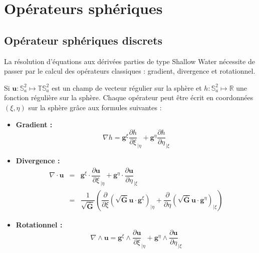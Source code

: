 
\chapter{Opérateurs sphériques}

\section{Opérateur sphériques discrets}

La résolution d'équations aux dérivées parties de type Shallow Water nécessite de passer par le calcul des opérateurs classiques : gradient, divergence et rotationnel.

Si $\mathbf{u} : \mathbb{S}_a^2 \mapsto \mathbb{T}\mathbb{S}_a^2$ est un champ de vecteur régulier sur la sphère et $h : \mathbb{S}_a^2 \mapsto\mathbb{R}$ une fonction régulière sur la sphère.
Chaque opérateur peut être écrit en coordonnées $(\xi, \eta)$ sur la sphère grâce aux formules suivantes :

\begin{itemize}
\item \textbf{Gradient :}
\begin{equation}
\nabla h = \mathbf{g}^{\xi} \dfrac{\partial h}{\partial \xi}_{|\eta} + \mathbf{g}^{\eta} \dfrac{\partial h}{\partial \eta}_{|\xi} 
\label{eq: gradient}
\end{equation}
\item \textbf{Divergence :}
\begin{equation}
\begin{array}{rcl}
\nabla \cdot \mathbf{u} & = & \mathbf{g}^{\xi} \cdot \dfrac{\partial \mathbf{u}}{\partial \xi}_{|\eta} + \mathbf{g}^{\eta} \cdot \dfrac{\partial \mathbf{u}}{\partial \eta}_{|\xi} \\
	& = & \dfrac{1}{\sqrt{\bar{\mathbf{G}}}} \left( \dfrac{\partial}{\partial \xi} \left( \sqrt{\bar{\mathbf{G}}} \mathbf{u} \cdot \mathbf{g}^{\xi} \right)_{|\eta} + \dfrac{\partial}{\partial \eta} \left( \sqrt{\bar{\mathbf{G}}} \mathbf{u} \cdot \mathbf{g}^{\eta} \right)_{|\xi} \right) 
\end{array}
\label{eq: divergence}
\end{equation}
\item \textbf{Rotationnel :}
\begin{equation}
\nabla \wedge \mathbf{u} = \mathbf{g}^{\xi} \wedge \dfrac{\partial \mathbf{u}}{\partial \xi}_{|\eta} + \mathbf{g}^{\eta} \wedge \dfrac{\partial \mathbf{u}}{\partial \eta}_{|\xi}  
\label{eq: rotationnel}
\end{equation}
\end{itemize}

